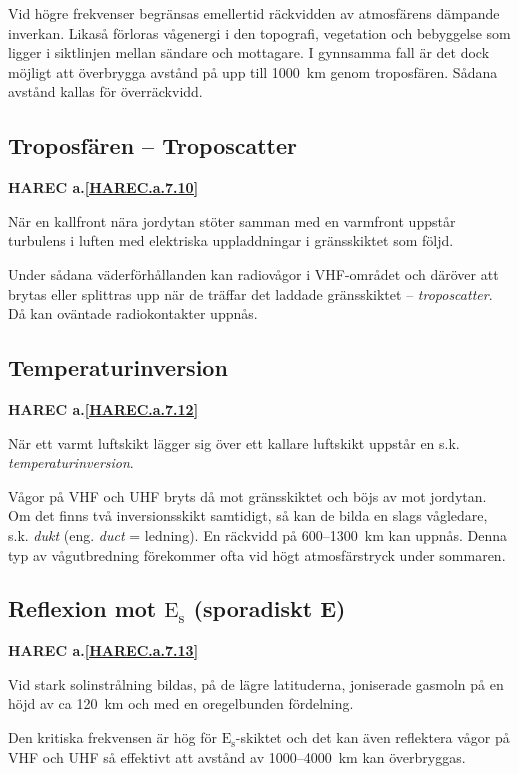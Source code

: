 Vid högre frekvenser begränsas emellertid räckvidden av atmosfärens
dämpande inverkan.
Likaså förloras vågenergi i den topografi, vegetation och bebyggelse som ligger
i siktlinjen mellan sändare och mottagare.
I gynnsamma fall är det dock möjligt att överbrygga avstånd på upp till 1000~km
genom troposfären.
Sådana avstånd kallas för överräckvidd.

\subsection{Troposfären -- Troposcatter}
\textbf{
HAREC a.\ref{HAREC.a.7.10}\label{myHAREC.a.7.10}
}

När en kallfront nära jordytan stöter samman med en varmfront uppstår turbulens
i luften med elektriska uppladdningar i gränsskiktet som följd.

Under sådana väderförhållanden kan radiovågor i VHF-området och däröver att
brytas eller splittras upp när de träffar det laddade gränsskiktet --
\emph{troposcatter}.
Då kan oväntade radiokontakter uppnås.

\subsection{Temperaturinversion}
\textbf{
HAREC a.\ref{HAREC.a.7.12}\label{myHAREC.a.7.12}
}

När ett varmt luftskikt lägger sig över ett kallare luftskikt uppstår
en s.k. \emph{temperaturinversion}.

Vågor på VHF och UHF bryts då mot gränsskiktet och böjs av mot jordytan.
Om det finns två inversionsskikt samtidigt, så kan de bilda
en slags vågledare, s.k. \emph{dukt} (eng. \emph{duct} = ledning).
En räckvidd på 600--1300~km kan uppnås.
Denna typ av vågutbredning förekommer ofta vid högt atmosfärstryck under
sommaren.

\subsection{Reflexion mot $\mathrm{E_s}$ (sporadiskt E)}
\textbf{
HAREC a.\ref{HAREC.a.7.13}\label{myHAREC.a.7.13}
}

Vid stark solinstrålning bildas, på de lägre latituderna, joniserade
gasmoln på en höjd av ca 120~km och med en oregelbunden fördelning.

Den kritiska frekvensen är hög för \(\mathrm{E_s}\)-skiktet och det kan även
reflektera vågor på VHF och UHF så effektivt att avstånd av 1000--4000~km kan
överbryggas.

